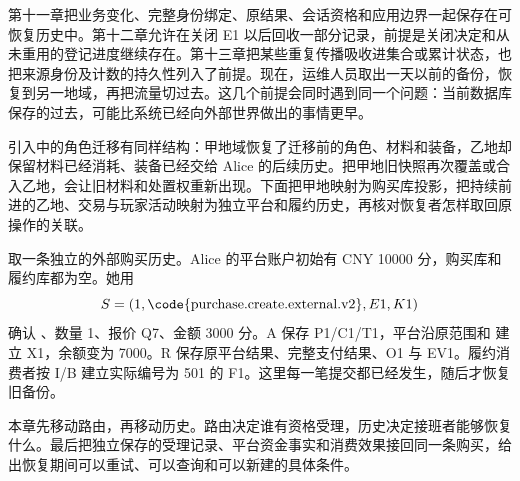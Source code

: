 \newcommand{\CFourteenFigure}[3]{%
  \begin{figure}[htbp]
  \centering
  \begingroup
  \definecolor{Blue}{HTML}{315E76}
  \definecolor{Gold}{HTML}{A96B34}
  \tikzset{every node/.style={font=\small\sffamily,align=center},
    box/.style={draw=Blue,rounded corners=2pt,fill=blue!3,inner sep=6pt,
      text width=3.4cm,minimum height=.8cm},
    good/.style={box,draw=green!35!black,fill=green!4},
    warn/.style={box,draw=Gold,fill=orange!5},
    arr/.style={-{Stealth[length=2mm]},thick,draw=Blue},
    note/.style={font=\footnotesize\sffamily,align=center,text=black!75},
    lane/.style={draw=black!30,densely dashed},
    cell/.style={draw=Blue,minimum width=2.2cm,minimum height=.7cm,
      fill=blue!3,inner sep=3pt}}
  \resizebox{.98\linewidth}{!}{}
  \endgroup
  \caption{#2}\label{#3}
  \end{figure}}

第十一章把业务变化、完整身份绑定、原结果、会话资格和应用边界一起保存在可恢复历史中。第十二章允许在关闭 E1 以后回收一部分记录，前提是关闭决定和从未重用的登记进度继续存在。第十三章把某些重复传播吸收进集合或累计状态，也把来源身份及计数的持久性列入了前提。现在，运维人员取出一天以前的备份，恢复到另一地域，再把流量切过去。这几个前提会同时遇到同一个问题：当前数据库保存的过去，可能比系统已经向外部世界做出的事情更早。

引入中的角色迁移有同样结构：甲地域恢复了迁移前的角色、材料和装备，乙地却保留材料已经消耗、装备已经交给 Alice 的后续历史。把甲地旧快照再次覆盖或合入乙地，会让旧材料和处置权重新出现。下面把甲地映射为购买库投影，把持续前进的乙地、交易与玩家活动映射为独立平台和履约历史，再核对恢复者怎样取回原操作的关联。

取一条独立的外部购买历史。Alice 的平台账户初始有 CNY 10000 分，购买库和履约库都为空。她用
\[
S=(1,\text{\code{purchase.create.external.v2}},E1,K1)
\]
确认 、数量 1、报价 Q7、金额 3000 分。A 保存 P1/C1/T1，平台沿原范围和  建立 X1，余额变为 7000。R 保存原平台结果、完整支付结果、O1 与 EV1。履约消费者按 I/B 建立实际编号为 501 的 F1。这里每一笔提交都已经发生，随后才恢复旧备份。

本章先移动路由，再移动历史。路由决定谁有资格受理，历史决定接班者能够恢复什么。最后把独立保存的受理记录、平台资金事实和消费效果接回同一条购买，给出恢复期间可以重试、可以查询和可以新建的具体条件。
